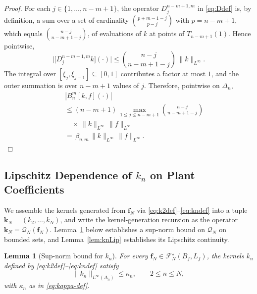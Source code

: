 \documentclass[10pt,a4paper]{amsart}
\newcommand{\Linf}{L^\infty}
\newtheorem{lemma}{Lemma}
\begin{document}
\begin{proof}
For each $j\in\{1,\ldots,n-m+1\}$, the operator $D_j^{n-m+1,m}$ in \eqref{eq:Ddef} is, by definition, a sum over a set of cardinality $\binom{p+m-1-j}{p-j}$ with $p = n-m+1$, which equals $\binom{n-j}{n-m+1-j}$, of evaluations of $k$ at points of $T_{n-m+1}(1)$. Hence pointwise,
\begin{equation}
\bigl|\bigl[D_j^{n-m+1,m}k\bigr](\cdot)\bigr|
\le \binom{n-j}{n-m+1-j}\,\|k\|_{\Linf}.
\label{eq:Dbnd}
\end{equation}
The integral over $[\xi_j,\xi_{j-1}]\subseteq[0,1]$ contributes a factor at most $1$, and the outer summation is over $n-m+1$ values of $j$. Therefore, pointwise on $\Delta_n$,
\begin{eqnarray}
&& |B_n^m[k,f](\cdot)| \nonumber \\
&& \le (n-m+1)\,\max_{1\le j\le n-m+1}\binom{n-j}{n-m+1-j} \nonumber \\
&& \quad \times\, \|k\|_{\Linf}\,\|f\|_{\Linf} \nonumber \\
&& =\, \beta_{n,m}\,\|k\|_{\Linf}\,\|f\|_{\Linf}.
\label{eq:Bbnd-pw}
\end{eqnarray}
\end{proof}

\subsection{Lipschitz Dependence of $k_n$ on Plant Coefficients}
\label{sec:knLip}

We assemble the kernels generated from $\mathbf{f}_N$ via \eqref{eq:k2def}--\eqref{eq:kndef} into a tuple $\mathbf{k}_N = (k_2, \ldots, k_N)$, and write the kernel-generation recursion as the operator $\mathbf{k}_N = \mathcal{Q}_N(\mathbf{f}_N)$.
Lemma~\ref{lem:knBound} below establishes a sup-norm bound on $\mathcal{Q}_N$ on bounded sets, and Lemma~\ref{lem:knLip} establishes its Lipschitz continuity.

\begin{lemma}[Sup-norm bound for $k_n$]
\label{lem:knBound}
For every $\mathbf{f}_N\in\mathcal{F}_N^\star(B_f,L_f)$, the kernels $k_n$ defined by \eqref{eq:k2def}--\eqref{eq:kndef} satisfy
\begin{equation}
\|k_n\|_{\Linf(\Delta_n)} \le \kappa_n,
\qquad 2\le n\le N,
\label{eq:knBound}
\end{equation}
with $\kappa_n$ as in \eqref{eq:kappa-def}.
\end{lemma}
\end{document}
